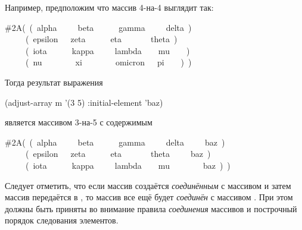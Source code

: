 \begin{defun}[Функция]
Например, предположим что массив 4-на-4  выглядит так:
\begin{lisp}
\#2A(~(~alpha~~~~~beta~~~~~~gamma~~~~~delta~) \\
~~~~~(~epsilon~~~zeta~~~~~~eta~~~~~~~theta~) \\
~~~~~(~iota~~~~~~kappa~~~~~lambda~~~~mu~~~~) \\
~~~~~(~nu~~~~~~~~xi~~~~~~~~omicron~~~pi~~~~)~)
\end{lisp}
Тогда результат выражения
\begin{lisp}
(adjust-array m '(3 5) :initial-element 'baz)
\end{lisp}
является массивом 3-на-5 с содержимым
\begin{lisp}
\#2A(~(~alpha~~~~~beta~~~~~~gamma~~~~~delta~~~~~baz~) \\
~~~~~(~epsilon~~~zeta~~~~~~eta~~~~~~~theta~~~~~baz~) \\
~~~~~(~iota~~~~~~kappa~~~~~lambda~~~~mu~~~~~~~~baz~)~)
\end{lisp}
Следует отметить, что если массив  создаётся \emph{соединённым} с массивом
 и затем массив  передаётся в , то массив 
все ещё будет \emph{соединён} с массивом . При этом должны быть приняты во
внимание правила \emph{соединения} массивов и построчный порядок следования
элементов.
\end{defun}

\fi